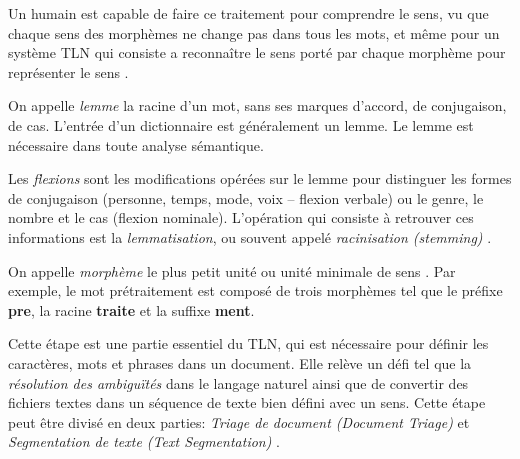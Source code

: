 Un humain est capable de faire ce traitement pour comprendre le sens, vu que chaque sens des morphèmes ne change pas dans tous les mots, et même pour un système TLN qui consiste a reconnaître le sens porté par chaque morphème pour représenter le sens \citep{natural-language-processing}.

\begin{definition}[Lemme]
    On appelle \textit{lemme} la racine d’un mot, sans ses marques d’accord, de conjugaison, de cas. L'entrée d'un dictionnaire est généralement un lemme. Le lemme est nécessaire dans toute analyse sémantique. \citep{automatic-nlp}
\end{definition}

\begin{definition}[Flexion]
    Les \textit{flexions} sont les modifications opérées sur le lemme pour distinguer les formes de conjugaison (personne, temps, mode, voix – flexion verbale) ou le genre, le nombre et le cas (flexion nominale). L’opération qui consiste à retrouver ces informations est la \textit{lemmatisation}, ou souvent appelé \textit{racinisation (stemming)} \citep{automatic-nlp}.
\end{definition}

\begin{definition}[Morphème]
    On appelle \textit{morphème} le plus petit unité ou unité minimale de sens \citep{natural-language-processing}. Par exemple, le mot prétraitement est composé de trois morphèmes tel que le préfixe \textbf{pre}, la racine \textbf{traite} et la suffixe \textbf{ment}.
\end{definition}

Cette étape est une partie essentiel du TLN, qui est nécessaire pour définir les caractères, mots et phrases dans un document. Elle relève un défi tel que la \emph{résolution des ambiguïtés} dans le langage naturel ainsi que de convertir des fichiers textes dans un séquence de texte bien défini avec un sens. Cette étape peut être divisé en deux parties: \textit{Triage de document (Document Triage)} et \textit{Segmentation de texte (Text Segmentation)} \citep{handbook-nlp}.


